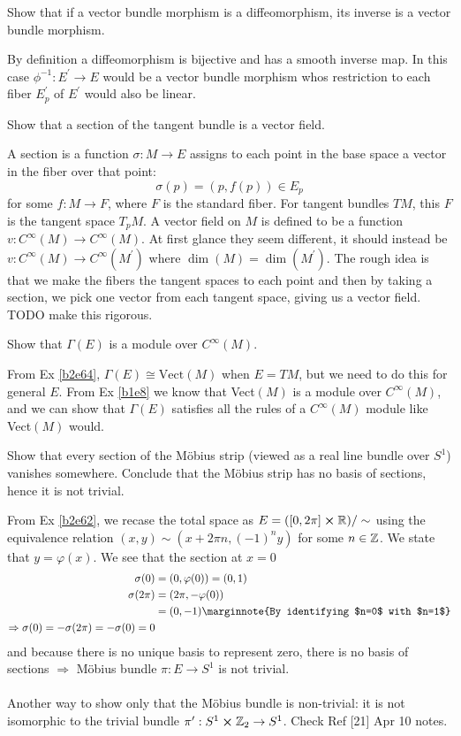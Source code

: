 \documentclass[10pt]{article}
\begin{document}
\begin{example}
	Show that if a vector bundle morphism is a diffeomorphism, its inverse is a vector bundle morphism.
\end{example}
\sol By definition a diffeomorphism is bijective and has a smooth inverse map. In this case $\phi^{-1}:E^\prime \to E$ would be a vector bundle morphism whos restriction to each fiber $E_p^\prime$ of $E^\prime$ would also be linear.


\begin{example}\label{b2e64}
	Show that a section of the tangent bundle is a vector field.
\end{example}
\sol A section is a function $\sigma:M\to E$ assigns to each point in the base space a vector in the fiber over that point:
$$
\sigma(p) = (p,f(p)) \in E_p
$$
for some $f:M\to F$, where $F$ is the standard fiber. For tangent bundles $TM$, this $F$ is the tangent space $T_pM$. A vector field on $M$ is defined to be a function $v:C^\infty(M) \to C^\infty(M)$. At first glance they seem different, it should instead be $v:C^\infty(M) \to C^\infty(M^\prime)$ where $\dim(M) = \dim(M^\prime)$. The rough idea is that we make the fibers the tangent spaces to each point and then by taking a section, we pick one vector from each tangent space, giving us a vector field. TODO make this rigorous.


\begin{example}
	Show that $\Gamma(E)$ is a module over $C^\infty(M)$.
\end{example}
\sol From Ex \ref{b2e64}, $\Gamma(E) \cong \text{Vect}(M)$ when $E = TM$, but we need to do this for general $E$. From Ex \ref{b1e8} we know that Vect$(M)$ is a module over $C^\infty(M)$, and we can show that $\Gamma(E)$ satisfies all the rules of a $C^\infty(M)$ module like Vect$(M)$ would.


\begin{example}
	Show that every section of the Möbius strip (viewed as a real line bundle over $S^1$) vanishes somewhere. Conclude that the Möbius strip has no basis of sections, hence it is not trivial.
\end{example}
\sol From Ex \ref{b2e62}, we recase the total space as $E = ([0,2\pi] \cross \mathbb{R}) / \sim$ using the equivalence relation $(x,y) \sim (x+2\pi n,(-1)^ny)$ for some $n \in \mathbb{Z}$. We state that $y = \varphi(x)$. We see that the section at $x=0$
$$
\begin{aligned}
	\sigma(0) &= (0, \varphi(0)) = (0, 1)\\
	\sigma(2\pi) &= (2\pi, -\varphi(0))\\
	&= (0, -1)\marginnote{By identifying $n=0$ with $n=1$}\\
	\Rightarrow \sigma(0) = -\sigma(2\pi) = -\sigma(0) = 0
\end{aligned}
$$
and because there is no unique basis to represent zero, there is no basis of sections $\Rightarrow$ Möbius bundle $\pi:E\to S^1$ is not trivial.\\\\
Another way to show only that the Möbius bundle is non-trivial: it is not isomorphic to the trivial bundle $\pi^\prime:S^1\cross \mathbb{Z}_2 \to S^1$. Check Ref [21] Apr 10 notes.
\end{document}
